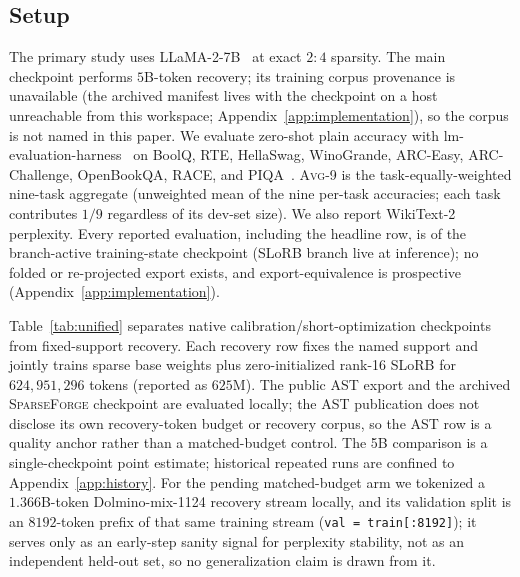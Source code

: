 \documentclass{article}
\newcommand{\method}{\textsc{SparseForge}}
\newcommand{\taskavg}{\textsc{Avg}-9}
\begin{document}
\subsection{Setup}
The primary study uses LLaMA-2-7B~\citep{touvron2023llama2} at exact $2{:}4$ sparsity. The main checkpoint performs $5$B-token recovery; its training corpus provenance is unavailable (the archived manifest lives with the checkpoint on a host unreachable from this workspace; Appendix~\ref{app:implementation}), so the corpus is not named in this paper. We evaluate zero-shot plain accuracy with lm-evaluation-harness~\citep{biderman2024lmeval} on BoolQ, RTE, HellaSwag, WinoGrande, ARC-Easy, ARC-Challenge, OpenBookQA, RACE, and PIQA~\citep{clark2019boolq,wang2019superglue,zellers2019hellaswag,sakaguchi2021winogrande,clark2018arc,mihaylov2018openbookqa,lai2017race,bisk2020piqa}. \taskavg{} is the task-equally-weighted nine-task aggregate (unweighted mean of the nine per-task accuracies; each task contributes $1/9$ regardless of its dev-set size). We also report WikiText-2 perplexity. Every reported evaluation, including the headline row, is of the branch-active training-state checkpoint (SLoRB branch live at inference); no folded or re-projected export exists, and export-equivalence is prospective (Appendix~\ref{app:implementation}).

Table~\ref{tab:unified} separates native calibration/short-optimization checkpoints from fixed-support recovery. Each recovery row fixes the named support and jointly trains sparse base weights plus zero-initialized rank-16 SLoRB for $624{,}951{,}296$ tokens (reported as $625$M). The public AST export and the archived \method{} checkpoint are evaluated locally; the AST publication does not disclose its own recovery-token budget or recovery corpus, so the AST row is a quality anchor rather than a matched-budget control. The 5B comparison is a single-checkpoint point estimate; historical repeated runs are confined to Appendix~\ref{app:history}. For the pending matched-budget arm we tokenized a $1.366$B-token Dolmino-mix-1124 recovery stream locally, and its validation split is an $8192$-token prefix of that same training stream (\texttt{val = train[:8192]}); it serves only as an early-step sanity signal for perplexity stability, not as an independent held-out set, so no generalization claim is drawn from it.
\end{document}
